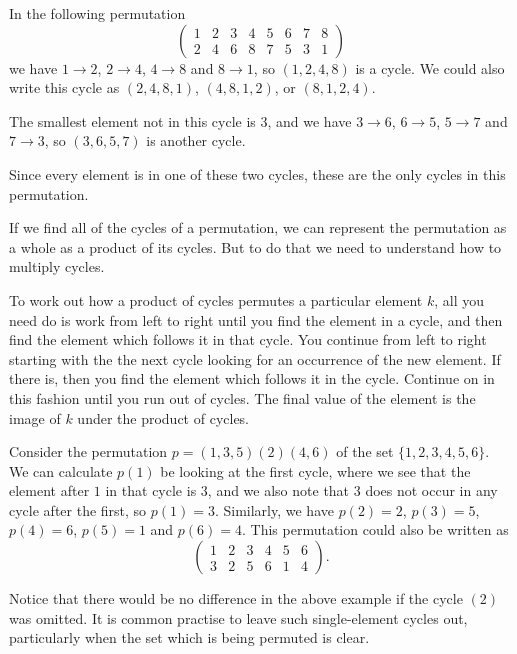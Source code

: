 \begin{example}
  In the following permutation
  \[
    \begin{pmatrix}
      1 & 2 & 3 & 4 & 5 & 6 & 7 & 8 \\
      2 & 4 & 6 & 8 & 7 & 5 & 3 & 1
    \end{pmatrix}
  \]
  we have $1 \to 2$, $2 \to 4$, $4 \to 8$ and $8 \to 1$, so $(1,2,4,8)$ is
  a cycle.  We could also write this cycle as $(2, 4, 8, 1)$, $(4,8, 1, 2)$,
  or $(8, 1, 2, 4)$.
  
  The smallest element not in this cycle is $3$, and we have
  $3 \to 6$, $6 \to 5$, $5 \to 7$ and $7 \to 3$, so $(3, 6, 5, 7)$ is another
  cycle.
  
  Since every element is in one of these two cycles, these are the only cycles
  in this permutation.
\end{example}

If we find all of the cycles of a permutation, we can represent the permutation
as a whole as a product of its cycles.  But to do that we need to understand how
to multiply cycles.

To work out how a product of cycles permutes a particular element $k$, all you
need do is work from left to right until you find the element in a cycle, and
then find the element which follows it in that cycle.  You continue from left
to right starting with the the next cycle looking for an occurrence of the new
element.  If there is, then you find the element which follows it in the cycle.
Continue on in this fashion until you run out of cycles.  The final value of
the element is the image of $k$ under the product of cycles.

\begin{example}
  Consider the permutation $p = (1, 3, 5)(2)(4, 6)$ of the set
  $\{1, 2, 3, 4, 5, 6\}$.  We can calculate $p(1)$ be looking at the first
  cycle, where we see that the element after $1$ in that cycle is $3$, and we also
  note that $3$ does not occur in any cycle after the first, so $p(1) = 3$.
  Similarly, we have $p(2) = 2$, $p(3) = 5$, $p(4) = 6$, $p(5) = 1$ and
  $p(6) = 4$.  This permutation could also be written as
  \[
    \begin{pmatrix}
      1 & 2 & 3 & 4 & 5 & 6\\
      3 & 2 & 5 & 6 & 1 & 4
    \end{pmatrix}.
  \]
\end{example}

Notice that there would be no difference in the above example if the cycle
$(2)$ was omitted.  It is common practise to leave such single-element
cycles out, particularly when the set which is being permuted is clear.

